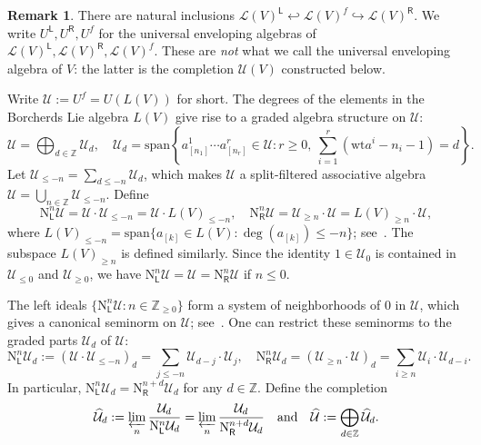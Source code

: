 \documentclass[12pt,a4paper,reqno]{amsart}
\numberwithin{equation}{section}
\theoremstyle{definition}
\newtheorem{remark}[theorem]{Remark}
\newcommand{\Z}{\mathbb{Z}}
\newcommand{\U}{\mathcal{U}}
\newcommand{\LL}{\mathcal{L}}
\def\L{\mathsf{L}}
\def\R{\mathsf{R}}
\def\spn{\mathrm{span}}
\def\wt{\mathrm{wt}}
\def\scrU{\mathscr{U}}
\def\rN{\mathrm{N}}
\begin{document}
\begin{remark}
    There are natural inclusions $\LL(V)^\L \hookleftarrow \LL(V)^f \hookrightarrow \LL(V)^\R$. We write $U^\L,U^\R,U^f$ for the universal enveloping algebras of $\LL(V)^\L,\LL(V)^\R, \LL(V)^f$. These are \emph{not} what we call the universal enveloping algebra of $V$: the latter is the completion $\scrU(V)$ constructed below.
\end{remark}









	Write $\U:=U^f=U(L(V))$ for short. The degrees of the elements in the Borcherds Lie algebra $L(V)$ give rise to a graded algebra structure on $\U$:
	\[
	\U=\bigoplus_{d\in \Z} \U_d,\quad \U_d=\spn\left\{a^1_{[n_1]}\cdots a^r_{[n_r]}\in \U: r\geq 0,\ \sum\limits_{i=1}^{r}\left(\wt a^i-n_i-1\right)=d \right\}.
	\]
	Let $\U_{\leq -n}=\sum_{d\leq -n} \U_d$, which makes $\U$ a split-filtered associative algebra $\U=\bigcup_{n\in \Z} \U_{\leq -n}$. Define
	\begin{equation}\label{eq:nei}
		\rN^n_\L \U=\U\cdot \U_{\leq -n}=\U\cdot L(V)_{\leq -n},\quad 	\rN^n_\R \U=\U_{\geq n}\cdot \U=L(V)_{\geq n}\cdot \U,
	\end{equation}
	where $L(V)_{\leq -n}=\spn\{a_{[k]}\in L(V): \deg(a_{[k]})\leq -n\}$; see~\cite[Lemma 2.4.2]{DGK2}. The subspace $L(V)_{\geq n}$ is defined similarly. Since the identity $1\in \U_0$ is contained in $\U_{\leq 0}$ and $\U_{\geq 0}$, we have $\rN^n_\L \U=\U=\rN^n_\R \U	$ if $n\leq 0$.

	The left ideals $\{\rN^n_\L \U:n\in \Z_{\geq 0}\}$ form a system of neighborhoods of $0$ in $\U$, which gives a canonical seminorm on $\U$; see~\cite[Definition A.6.1]{DGK2}. One can restrict these seminorms to the graded parts $\U_d$ of $\U$:
	\begin{equation}\label{eq:completion}
		\rN^n_\L \U_d:=(\U\cdot \U_{\leq -n})_d=\sum_{j\leq -n} \U_{d-j}\cdot \U_j,\quad  	\rN^n_\R \U_d=(\U_{\geq n}\cdot \U)_d=\sum_{i\geq n} \U_i\cdot \U_{d-i}.
	\end{equation}
	In particular, $\rN^n_\L \U_d=\rN^{n+d}_\R \U_d$ for any $d\in \Z$. Define the completion
	\[
	\widehat{\U}_d:=\varprojlim_n\frac{\U_d}{\rN^n_\L \U_d}=\varprojlim_n\frac{\U_d}{\rN^{n+d}_\R \U_d}\quad \text{and}\quad \widehat{\U}:=\bigoplus_{d\in \Z} \widehat{\U}_d.
	\]


\end{document}
